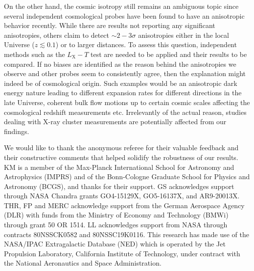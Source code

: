 \documentclass{aa}   %
\begin{document}
On the other hand, the cosmic isotropy still remains an ambiguous topic since several independent cosmological probes have been found to have an anisotropic behavior recently. While there are results not reporting any significant anisotropies, others claim to detect $\sim 2-3\sigma$ anisotropies either in the local Universe ($z\lesssim 0.1$) or to larger distances. To assess this question, independent methods such as the $L_{\text{X}}-T$ test are needed to be applied and their results to be compared. If no biases are identified as the reason behind the anisotropies we observe and other probes seem to consistently agree, then the explanation might indeed be of cosmological origin. Such examples would be an anisotropic dark energy nature leading to different expansion rates for different directions in the late Universe, coherent bulk flow motions up to certain cosmic scales affecting the cosmological redshift measurements etc. Irrelevantly of the actual reason, studies dealing with X-ray cluster measurements are potentially affected from our findings.


\begin{acknowledgements}  
We would like to thank the anonymous referee for their valuable feedback and their constructive comments that helped solidify the robustness of our results. KM is a member of the Max-Planck International School for Astronomy and Astrophysics (IMPRS) and of the Bonn-Cologne Graduate School for Physics and Astronomy (BCGS), and thanks for their support. GS acknowledges support through NASA Chandra grants GO4-15129X, GO5-16137X, and AR9-20013X. THR, FP and MERC acknowledge support from the German Aerospace Agency (DLR) with funds from the Ministry of Economy and Technology (BMWi) through grant 50 OR 1514. LL acknowledges support from NASA through contracts 80NSSCK0582 and 80NSSC19K0116.
This research has made use of the NASA/IPAC Extragalactic Database (NED)
which is operated by the Jet Propulsion Laboratory, California Institute of Technology, under contract with the National Aeronautics and Space Administration.
\end{acknowledgements}


\newpage



\end{document}
